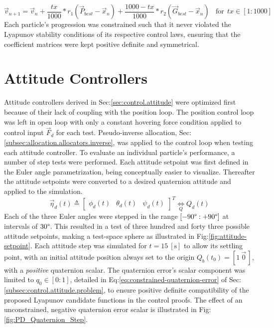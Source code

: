 \begin{equation}
\vec{v}_{n+1}=\vec{v}_n+\frac{tx}{1000}\ast r_1(\vec{P}_{best}-\vec{x}_n)+\frac{1000-tx}{1000}\ast r_2(\vec{G}_{best}-\vec{x}_n)~~~~\text{for}~~tx\in[1:1000]
\end{equation}
Each particle's progression was constrained such that it never violated the Lyapunov stability conditions of its respective control laws, ensuring that the coefficient matrices were kept positive definite and symmetrical.
\section{Attitude Controllers}
\label{sec:simulation.attitude}
Attitude controllers derived in Sec:\ref{sec:control.attitude} were optimized first because of their lack of coupling with the position loop. The position control loop was left in open loop with only a constant hovering force condition applied to control input $\vec{F}_d$ for each test. Pseudo-inverse allocation, Sec:\ref{subsec:allocation.allocators.inverse}, was applied to the control loop when testing each attitude controller. To evaluate an individual particle's performance, a number of step tests were performed. Each attitude setpoint was first defined in the Euler angle parametrization, being conceptually easier to visualize. Thereafter the attitude setpoints were converted to a desired quaternion attitude and applied to the simulation.
\begin{equation}
\vec{\eta}_d(t)\triangleq \begin{bmatrix}
\phi_d(t)&
\theta_d(t)&
\psi_d(t)
\end{bmatrix}^T\underset{Q}{\iff}Q_d(t)
\end{equation}
Each of the three Euler angles were stepped in the range $[-90\text{\textdegree}:+90\text{\textdegree}]$ at intervals of $30\text{\textdegree}$. This resulted in a test of three hundred and forty three possible attitude setpoints, making a test-space sphere as illustrated in Fig:\ref{fig:attitude-setpoint}. Each attitude step was simulated for $t=15~[\text{s}]$ to allow its settling point, with an initial attitude position always set to the origin $Q_b(t_0)=[1~\vec{0}\hspace{2pt}]$, with a \emph{positive} quaternion scalar. The quaternion error's scalar component was limited to $q_0\in[0:1]$, detailed in Eq:\ref{eq:constrained-quaternion-error} of Sec:\ref{subsec:control.attitude.problem}, to ensure positive definite compatibility of the proposed Lyapunov candidate functions in the control proofs. The effect of an unconstrained, negative quaternion error scalar is illustrated in Fig:\ref{fig:PD_Quaternion_Step}. 
